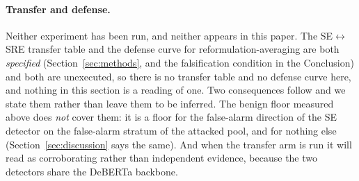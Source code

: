 \paragraph{Transfer and defense.}
Neither experiment has been run, and neither appears in this paper. The
SE$\leftrightarrow$SRE transfer table and the defense curve for reformulation-averaging are
both \emph{specified} (Section~\ref{sec:methods}, and the falsification condition in the
Conclusion) and both are unexecuted, so there is no transfer table and no defense curve
here, and nothing in this section is a reading of one. Two consequences follow and we
state them rather than leave them to be inferred. The benign floor measured above does
\emph{not} cover them: it is a floor for the false-alarm direction of the SE detector on the
false-alarm stratum of the attacked pool, and for nothing else
(Section~\ref{sec:discussion} says the same). And
when the transfer arm is run it will read as corroborating rather than independent
evidence, because the two detectors share the DeBERTa backbone.
